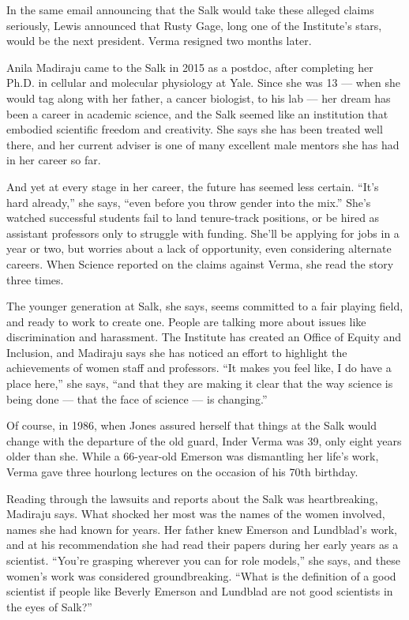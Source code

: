 In the same email announcing that the Salk would take these alleged
claims seriously, Lewis announced that Rusty Gage, long one of the
Institute's stars, would be the next president. Verma resigned two
months later.

Anila Madiraju came to the Salk in 2015 as a postdoc, after completing
her Ph.D. in cellular and molecular physiology at Yale. Since she was 13
--- when she would tag along with her father, a cancer biologist, to his
lab --- her dream has been a career in academic science, and the Salk
seemed like an institution that embodied scientific freedom and
creativity. She says she has been treated well there, and her current
adviser is one of many excellent male mentors she has had in her career
so far.

And yet at every stage in her career, the future has seemed less
certain. ``It's hard already,'' she says, ``even before you throw gender
into the mix.'' She's watched successful students fail to land
tenure-track positions, or be hired as assistant professors only to
struggle with funding. She'll be applying for jobs in a year or two, but
worries about a lack of opportunity, even considering alternate careers.
When Science reported on the claims against Verma, she read the story
three times.

The younger generation at Salk, she says, seems committed to a fair
playing field, and ready to work to create one. People are talking more
about issues like discrimination and harassment. The Institute has
created an Office of Equity and Inclusion, and Madiraju says she has
noticed an effort to highlight the achievements of women staff and
professors. ``It makes you feel like, I do have a place here,'' she
says, ``and that they are making it clear that the way science is being
done --- that the face of science --- is changing.''

Of course, in 1986, when Jones assured herself that things at the Salk
would change with the departure of the old guard, Inder Verma was 39,
only eight years older than she. While a 66-year-old Emerson was
dismantling her life's work, Verma gave three hourlong lectures on the
occasion of his 70th birthday.

Reading through the lawsuits and reports about the Salk was
heartbreaking, Madiraju says. What shocked her most was the names of the
women involved, names she had known for years. Her father knew Emerson
and Lundblad's work, and at his recommendation she had read their papers
during her early years as a scientist. ``You're grasping wherever you
can for role models,'' she says, and these women's work was considered
groundbreaking. ``What is the definition of a good scientist if people
like Beverly Emerson and Lundblad are not good scientists in the eyes of
Salk?''

